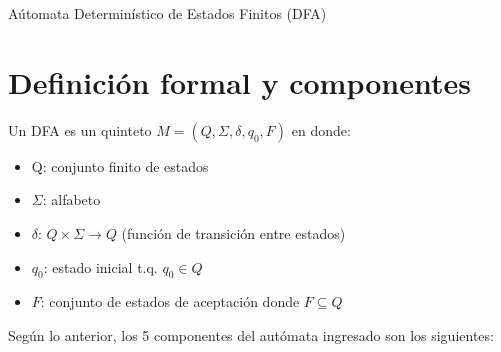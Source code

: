 \documentclass{article}
\begin{document}
\begin{center}
  {\LARGE Aútomata Determinístico de Estados Finitos (DFA)}
\end{center}


\section{Definición formal y componentes}

  Un DFA es un quinteto $M = (Q, \Sigma, \delta, q_0, F)$ en donde:

  \begin{itemize}
      \item Q: conjunto finito de estados
      \item $\Sigma$: alfabeto
      \item $\delta$: $Q \times \Sigma \rightarrow Q$ (función de transición entre estados)
      \item $q_0$: estado inicial t.q. $q_0 \in Q$
      \item $F$: conjunto de estados de aceptación donde $F \subseteq Q$\newline
  \end{itemize}

Según lo anterior, los 5 componentes del autómata ingresado son los siguientes:\\

\end{document}

